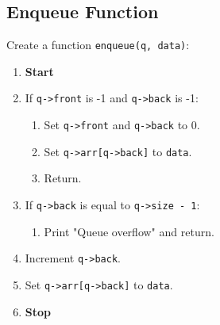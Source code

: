 {  \subsection{Enqueue Function}
  Create a function \texttt{enqueue(q, data)}:
  \begin{enumerate}[label=\arabic*:,left=0pt]
    \item \textbf{Start}
    \item If \texttt{q->front} is -1 and \texttt{q->back} is -1:
          \begin{enumerate}[label=2.\arabic*.]
            \item Set \texttt{q->front} and \texttt{q->back} to 0.
            \item Set \texttt{q->arr[q->back]} to \texttt{data}.
            \item Return.
          \end{enumerate}
    \item If \texttt{q->back} is equal to \texttt{q->size - 1}:
          \begin{enumerate}[label=2.\arabic*.]
            \item Print "Queue overflow" and return.
          \end{enumerate}
    \item Increment \texttt{q->back}.
    \item Set \texttt{q->arr[q->back]} to \texttt{data}.
    \item \textbf{Stop}
  \end{enumerate}

}

